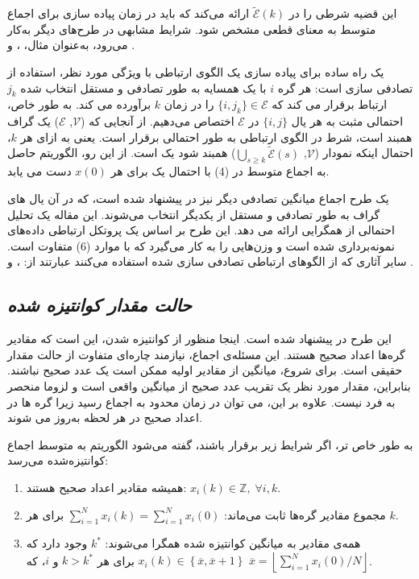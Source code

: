 \documentclass[12pt]{article} %
\begin{document}
	\par
	این قضیه شرطی را در $\tilde{\mathscr{E}}(k)$ ارائه می‌کند که باید در زمان پیاده سازی برای اجماع متوسط به معنای قطعی مشخص شود. شرایط مشابهی در طرح‌های دیگر به‌کار می‌رود، به‌عنوان مثال، \cite{bib05}، \cite{bib12} و  \cite{bib16}.
	\par
	یک راه ساده برای پیاده سازی یک الگوی ارتباطی با ویژگی مورد نظر، استفاده از تصادفی سازی است: هر گره $i$ با یک همسایه به طور تصادفی و مستقل انتخاب شده $j_k$ ارتباط برقرار می کند که $\{i, j_k\} \in \mathscr{E}$ را در زمان $k$ برآورده می کند. به طور خاص، احتمالی مثبت به هر یال $\{i, j\}$ در $\mathscr{E}$ اختصاص می‌دهیم. از آنجایی که ($\mathscr{V}$, $\mathscr{E}$) یک گراف همبند است، شرط در الگوی ارتباطی به طور احتمالی برقرار است. یعنی به ازای هر $k$، احتمال اینکه نمودار ($\mathscr{V}$, $\bigcup_{s \geq k} \tilde{\mathscr{E}}(s)$) همبند شود یک است. از این رو، الگوریتم حاصل به اجماع متوسط در (4) با احتمال یک برای هر $x(0)$ دست می یابد.
	\par
	یک طرح اجماع میانگین تصادفی دیگر نیز در \cite{bib10} پیشنهاد شده است، که در آن یال های گراف به طور تصادفی و مستقل از یکدیگر انتخاب می‌شوند. این مقاله یک تحلیل احتمالی از همگرایی ارائه می دهد. این طرح بر اساس یک پروتکل ارتباطی داده‌های نمونه‌برداری شده است و وزن‌هایی را به کار می‌گیرد که با موارد (6) متفاوت است. سایر آثاری که از الگوهای ارتباطی تصادفی‌ سازی شده استفاده می‌کنند عبارتند از: \cite{bib07}، \cite{bib21} و  \cite{bib27}.


			\subsection{\textit{حالت مقدار کوانتیزه شده}}
			
			این طرح در 
			 \cite{bib13}
			 پیشنهاد شده است.
			 اینجا منظور از کوانتیزه شدن، این است که مقادیر گره‌ها اعداد صحیح هستند. این مسئله‌ی اجماع، نیازمند چاره‌ای متفاوت از حالت مقدار حقیقی است. برای شروع، میانگین از مقادیر اولیه ممکن است یک عدد صحیح نباشند. بنابراین، مقدار مورد نظر یک تقریب عدد صحیح از میانگین واقعی است و لزوما منحصر به فرد نیست. علاوه بر این، می توان در زمان محدود به اجماع رسید زیرا گره ها در اعداد صحیح در هر لحظه به‌روز می شوند.
			 
			 به طور خاص تر، اگر شرایط زیر برقرار باشند، گفته می‌شود الگوریتم به متوسط اجماع کوانتیزه‌شده می‌رسد:
			 
			\begin{enumerate}
				\item همیشه مقادیر اعداد صحیح هستند:
				 $x_{i}(k)\in \mathbb{Z}, \; \forall{i, k}$.
				\item مجموع مقادیر گره‌ها ثابت می‌ماند:
				$\sum_{i=1}^{N}x_{i}(k)=\sum_{i=1}^{N}x_{i}(0)$ 
				برای هر 
				$k$.
				\item همه‌ی مقادیر به میانگین کوانتیزه شده همگرا می‌شوند: 
				 $k^{*}$ 
				وجود دارد که 
				$x_{i}(k)\in \left\{ \overline{x}, \overline{x}+1 \right\}$ 
				برای هر 
				$k > k^{*}$ 
				و 
				$i$، 
				که 
				$\overline{x}=\left\lfloor \sum_{i=1}^{N}x_{i}(0)/N \right\rfloor$.
			\end{enumerate}
		
\end{document}
